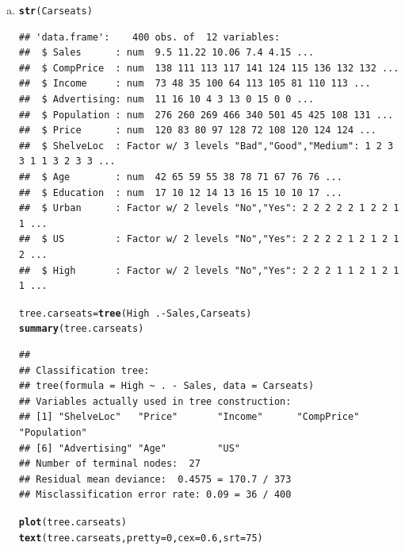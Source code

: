 \documentclass{article}\usepackage[]{graphicx}\usepackage[]{color}
\makeatletter
\newcommand{\hlnum}[1]{\textcolor[rgb]{0.686,0.059,0.569}{#1}}%
\newcommand{\hlopt}[1]{\textcolor[rgb]{0,0,0}{#1}}%
\newcommand{\hlstd}[1]{\textcolor[rgb]{0.345,0.345,0.345}{#1}}%
\newcommand{\hlkwb}[1]{\textcolor[rgb]{0.69,0.353,0.396}{#1}}%
\newcommand{\hlkwc}[1]{\textcolor[rgb]{0.333,0.667,0.333}{#1}}%
\newcommand{\hlkwd}[1]{\textcolor[rgb]{0.737,0.353,0.396}{\textbf{#1}}}%
\newenvironment{kframe}{%
 \def\at@end@of@kframe{}%
 \ifinner\ifhmode%
  \def\at@end@of@kframe{\end{minipage}}%
  \begin{minipage}{\columnwidth}%
 \fi\fi%
 \def\FrameCommand##1{\hskip\@totalleftmargin \hskip-\fboxsep
 \colorbox{shadecolor}{##1}\hskip-\fboxsep
     \hskip-\linewidth \hskip-\@totalleftmargin \hskip\columnwidth}%
 \MakeFramed {\advance\hsize-\width
   \@totalleftmargin\z@ \linewidth\hsize
   \@setminipage}}%
 {\par\unskip\endMakeFramed%
 \at@end@of@kframe}
\newenvironment{knitrout}{}{} %
\makeatother
\begin{document}
\begin{enumerate}[(a)]
\item
\begin{knitrout}
\color{fgcolor}\begin{kframe}
\begin{alltt}
\hlkwd{str}\hlstd{(Carseats)}
\end{alltt}
\begin{verbatim}
## 'data.frame':	400 obs. of  12 variables:
##  $ Sales      : num  9.5 11.22 10.06 7.4 4.15 ...
##  $ CompPrice  : num  138 111 113 117 141 124 115 136 132 132 ...
##  $ Income     : num  73 48 35 100 64 113 105 81 110 113 ...
##  $ Advertising: num  11 16 10 4 3 13 0 15 0 0 ...
##  $ Population : num  276 260 269 466 340 501 45 425 108 131 ...
##  $ Price      : num  120 83 80 97 128 72 108 120 124 124 ...
##  $ ShelveLoc  : Factor w/ 3 levels "Bad","Good","Medium": 1 2 3 3 1 1 3 2 3 3 ...
##  $ Age        : num  42 65 59 55 38 78 71 67 76 76 ...
##  $ Education  : num  17 10 12 14 13 16 15 10 10 17 ...
##  $ Urban      : Factor w/ 2 levels "No","Yes": 2 2 2 2 2 1 2 2 1 1 ...
##  $ US         : Factor w/ 2 levels "No","Yes": 2 2 2 2 1 2 1 2 1 2 ...
##  $ High       : Factor w/ 2 levels "No","Yes": 2 2 2 1 1 2 1 2 1 1 ...
\end{verbatim}
\begin{alltt}
\hlstd{tree.carseats}\hlkwb{=}\hlkwd{tree}\hlstd{(High}\hlopt{~}\hlstd{.}\hlopt{-}\hlstd{Sales, Carseats)}
\hlkwd{summary}\hlstd{(tree.carseats)}
\end{alltt}
\begin{verbatim}
## 
## Classification tree:
## tree(formula = High ~ . - Sales, data = Carseats)
## Variables actually used in tree construction:
## [1] "ShelveLoc"   "Price"       "Income"      "CompPrice"   "Population" 
## [6] "Advertising" "Age"         "US"         
## Number of terminal nodes:  27 
## Residual mean deviance:  0.4575 = 170.7 / 373 
## Misclassification error rate: 0.09 = 36 / 400
\end{verbatim}
\begin{alltt}
\hlkwd{plot}\hlstd{(tree.carseats)}
\hlkwd{text}\hlstd{(tree.carseats,} \hlkwc{pretty} \hlstd{=} \hlnum{0}\hlstd{,}\hlkwc{cex}\hlstd{=}\hlnum{0.6}\hlstd{,}\hlkwc{srt}\hlstd{=}\hlnum{75}\hlstd{)}
\end{alltt}
\end{kframe}

\end{knitrout}
\end{enumerate}
\end{document}
